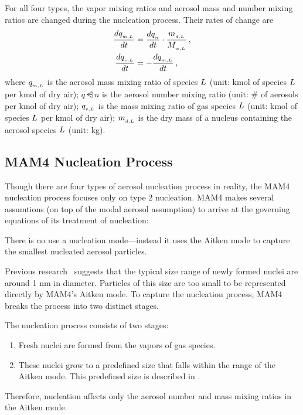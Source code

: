 For all four types, the vapor mixing ratios and aerosol mass and number mixing
ratios are changed during the nucleation process. Their rates of change are
\begin{align}
\frac{d q_{_{m,L}}}{dt} &= \frac{d q_{_{n}}}{dt} \cdot \frac{m_{_{d,L}}}{M_{_{w,L}}} \,, \label{eqn:aer}\\
\frac{dq_{_{v,L}}}{dt} &= -\frac{d q_{_{m,L}}}{dt} \,, \label{eqn:gas}
\end{align}
where $q_{_{m,L}}$ is the aerosol mass mixing ratio of species $L$
(unit: kmol of species $L$ per kmol of dry air); $q\dsub{n}$ is the aerosol
number mixing ratio (unit: \# of aerosols per kmol of dry air); $q_{_{v,L}}$ is
the mass mixing ratio of gas species $L$ (unit: kmol of species $L$
per kmol of dry air); $m_{_{d,L}}$ is the dry mass of a nucleus containing the
aerosol species $L$ (unit: kg).

\subsection{MAM4 Nucleation Process}

Though there are four types of aerosol nucleation process in reality, the MAM4
nucleation process focuses only on type 2 nucleation. MAM4 makes several
assumtions (on top of the modal aerosol assumption) to arrive at the
governing equations of its treatment of nucleation:

\begin{assume}
  There is no use a nucleation mode---instead it uses the Aitken mode to capture the smallest
  nucleated aerosol particles.
\end{assume}

Previous research~\cite{kerminen-2002-jas} suggests that the typical size
range of newly formed nuclei are around 1 nm in diameter. Particles of this
size are too small to be represented directly by MAM4's Aitken mode. To capture
the nucleation process, MAM4 breaks the process into two distinct stages.

\begin{assume}
  The nucleation process consists of two stages:
  \begin{enumerate}
    \item Fresh nuclei are formed from the vapors of gas species.
    \item These nuclei grow to a predefined size that falls within the range
      of the Aitken mode. This predefined size is described in
      .
  \end{enumerate}
  Therefore, nucleation affects only the aerosol number and mass mixing ratios
  in the Aitken mode.
\end{assume}

